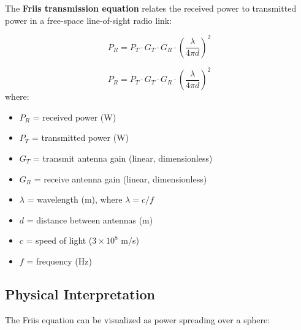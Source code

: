 The \textbf{Friis transmission equation} relates the received power to transmitted power in a free-space line-of-sight radio link:

\begin{equation}
P_R = P_T \cdot G_T \cdot G_R \cdot \left(\frac{\lambda}{4\pi d}\right)^2
\label{eq:friis}
\end{equation}

\begin{equation}
P_R = P_T \cdot G_T \cdot G_R \cdot \left(\frac{\lambda}{4\pi d}\right)^2
\end{equation}
where:
\begin{itemize}
\item $P_R$ = received power (W)
\item $P_T$ = transmitted power (W)
\item $G_T$ = transmit antenna gain (linear, dimensionless)
\item $G_R$ = receive antenna gain (linear, dimensionless)
\item $\lambda$ = wavelength (m), where $\lambda = c/f$
\item $d$ = distance between antennas (m)
\item $c$ = speed of light ($3 \times 10^8$ m/s)
\item $f$ = frequency (Hz)
\end{itemize}

\subsection{Physical Interpretation}

The Friis equation can be visualized as power spreading over a sphere:

\begin{center}
\end{center}

